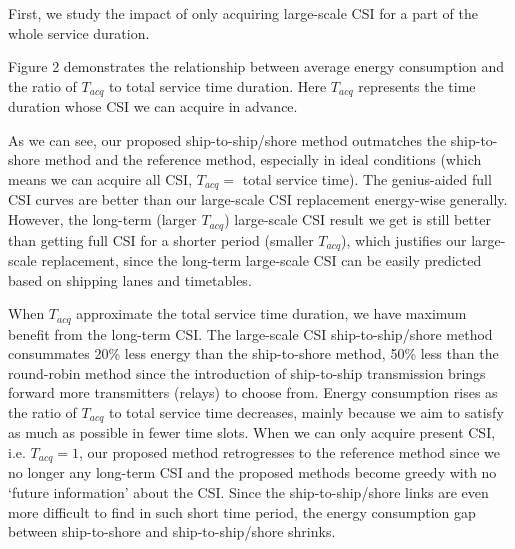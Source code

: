 \documentclass[conference]{IEEEtran}
\begin{document}

First, we study the impact of only acquiring large-scale CSI for a part of the whole service duration. 

Figure 2 demonstrates the relationship between average energy consumption and the ratio of ${T_{acq}}$ to total service time duration. Here ${T_{acq}}$ represents the time duration whose CSI we can acquire in advance. %

As we can see, our proposed ship-to-ship/shore method outmatches the ship-to-shore method and the reference method, especially in ideal conditions (which means we can acquire all CSI, ${T_{acq}}=$ total service time). 
The genius-aided full CSI curves are better than our large-scale CSI replacement energy-wise generally. 
However, the long-term (larger $T_{acq}$) large-scale CSI result we get is still better than getting full CSI for a shorter period (smaller $T_{acq}$), which justifies our large-scale replacement, since the long-term large-scale CSI can be easily predicted based on shipping lanes and timetables. 

When ${T_{acq}}$ approximate the total service time duration, we have maximum benefit from the long-term CSI. The large-scale CSI ship-to-ship/shore method consummates 20\% less energy than the ship-to-shore method, 50\% less than the round-robin method since the introduction of ship-to-ship transmission brings forward more transmitters (relays) to choose from. 
Energy consumption rises as the ratio of ${T_{acq}}$ to total service time decreases, mainly because we aim to satisfy as much as possible in fewer time slots. When we can only acquire present CSI, i.e. ${T_{acq}} = 1$, our proposed method retrogresses to the reference method since we no longer any long-term CSI and the proposed methods become greedy with no `future information' about the CSI. Since the ship-to-ship/shore links are even more difficult to find in such short time period, the energy consumption gap between ship-to-shore and ship-to-ship/shore shrinks.  
\end{document}
